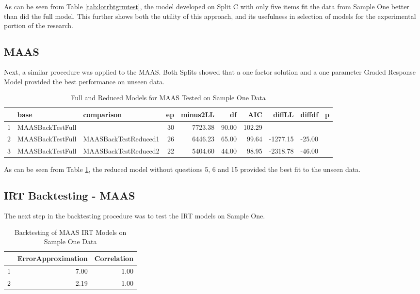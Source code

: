 \documentclass{article}
\begin{document}
As can be seen from Table \ref{tab:lotrbtgrmtest}, the model developed on Split C with only five items fit the data from Sample One better than did the full model. This further shows both the utility of this approach, and its usefulness in selection of models for the experimental portion of the research. 

\subsection{MAAS}
\label{sec:maas-1}

Next,  a similar procedure was applied to the MAAS. Both Splits showed that a one factor solution and a one parameter Graded Response Model provided the best performance on unseen data. 





\begin{table}[ht]
\centering
\begin{tabular}{rllrrrrrrr}
  \hline
 & base & comparison & ep & minus2LL & df & AIC & diffLL & diffdf & p \\ 
  \hline
1 & MAASBackTestFull &  &  30 & 7723.38 & 90.00 & 102.29 &  &  &  \\ 
  2 & MAASBackTestFull & MAASBackTestReduced1 &  26 & 6446.23 & 65.00 & 99.64 & -1277.15 & -25.00 &  \\ 
  3 & MAASBackTestFull & MAASBackTestReduced2 &  22 & 5404.60 & 44.00 & 98.95 & -2318.78 & -46.00 &  \\ 
   \hline
\end{tabular}
\caption{Full and Reduced Models for MAAS Tested on Sample One Data} 
\label{tab:maasbacktestsemcompare}
\end{table}
As can be seen from Table \ref{tab:maasbacktestsemcompare}, the reduced model without questions 5, 6 and 15  provided the best fit to the unseen data. 



\subsection{IRT Backtesting - MAAS}
\label{sec:irt-backtesting-maas}

The next step in the backtesting procedure was to test the IRT models on Sample One. 



\begin{table}[ht]
\centering
\begin{tabular}{rrr}
  \hline
 & ErrorApproximation & Correlation \\ 
  \hline
1 & 7.00 & 1.00 \\ 
  2 & 2.19 & 1.00 \\ 
   \hline
\end{tabular}
\caption{Backtesting of MAAS IRT Models on Sample One Data} 
\label{tab:maasbtgrmtest}
\end{table}
\end{document}
